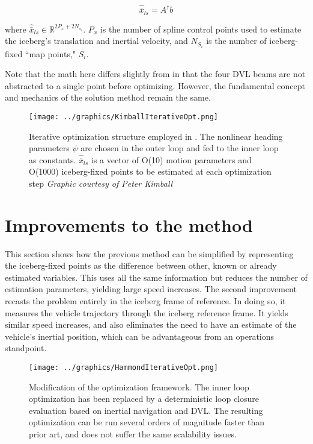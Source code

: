 \begin{equation}
    \hat{\bar{x}}_{ls} = A^{\dagger} b
    \label{eqn:LeastSquares}
\end{equation}

where $\hat{\bar{x}}_{ls}  \in \mathbb{R}^{ 2P_x + 2N_{s_i}}$. $P_x$ is the number of spline control points used to estimate the iceberg's translation and inertial velocity, and $N_{S_i}$ is the number of iceberg-fixed ``map points," $S_i$.


Note that the math here differs slightly from \cite{Kimball2011b} in that the four DVL beams are not abstracted to a single point before optimizing. However, the fundamental concept and mechanics of the solution method remain the same.

\begin{figure}[htbp]
   \centering
   \texttt{[image: ../graphics/KimballIterativeOpt.png]} %
   \caption{Iterative optimization structure employed in \cite{Kimball2011b}. The nonlinear heading parameters $\psi$ are chosen in the outer loop and fed to the inner loop as constants. $\hat{\bar{x}}_{ls}$ is a vector of O(10) motion parameters and O(1000) iceberg-fixed points to be estimated at each optimization step  \emph{Graphic courtesy of Peter Kimball}}
   \label{fig:NestedLoop}
\end{figure}




\section{Improvements to the method}

This section shows how the previous method can be simplified by representing the iceberg-fixed points as the difference between other, known or already estimated variables. This uses all the same information but reduces the number of estimation parameters, yielding large speed increases. The second improvement recasts the problem entirely in the iceberg frame of reference. In doing so, it measures the vehicle trajectory through the iceberg reference frame. It yields similar speed increases, and also eliminates the need to have an estimate of the vehicle's inertial position, which can be advantageous from an operations standpoint.

\begin{figure}[htbp]
   \centering
   \texttt{[image: ../graphics/HammondIterativeOpt.png]} %
   \caption{Modification of the optimization framework. The inner loop optimization has been replaced by a deterministic loop closure evaluation based on inertial navigation and DVL. The resulting optimization can be run several orders of magnitude faster than prior art, and does not suffer the same scalability issues.}
   \label{fig:NestedLoop2}
\end{figure}


